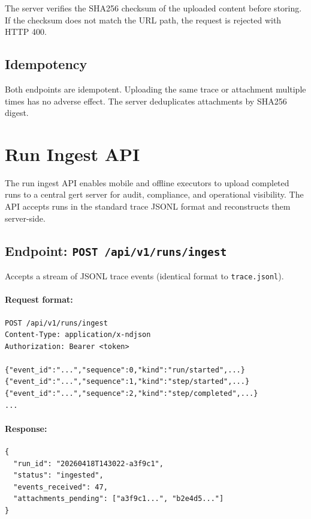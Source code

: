 The server verifies the SHA256 checksum of the uploaded content before storing. If the checksum does not match the URL path, the request is rejected with HTTP 400.

\subsection{Idempotency}

Both endpoints are idempotent. Uploading the same trace or attachment multiple times has no adverse effect. The server deduplicates attachments by SHA256 digest.

\section{Run Ingest API}

The run ingest API enables mobile and offline executors to upload completed runs to a central gert server for audit, compliance, and operational visibility. The API accepts runs in the standard trace JSONL format and reconstructs them server-side.

\subsection{Endpoint: \texttt{POST /api/v1/runs/ingest}}

Accepts a stream of JSONL trace events (identical format to \texttt{trace.jsonl}).

\paragraph{Request format:}

\begin{verbatim}
POST /api/v1/runs/ingest
Content-Type: application/x-ndjson
Authorization: Bearer <token>

{"event_id":"...","sequence":0,"kind":"run/started",...}
{"event_id":"...","sequence":1,"kind":"step/started",...}
{"event_id":"...","sequence":2,"kind":"step/completed",...}
...
\end{verbatim}

\paragraph{Response:}

\begin{verbatim}
{
  "run_id": "20260418T143022-a3f9c1",
  "status": "ingested",
  "events_received": 47,
  "attachments_pending": ["a3f9c1...", "b2e4d5..."]
}
\end{verbatim}

